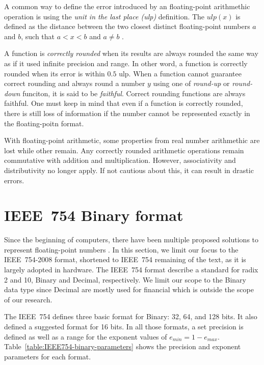 A common way to define the error introduced by an floating-point arithmethic
operation is using the \textit{unit in the last place (ulp)} definition.
The $ulp(x)$ is defined as the distance between the two closest distinct
floating-point numbers $a$ and $b$, such that $a < x < b$ and $a \neq b$ .

A function is \textit{correctly rounded} when its results are always rounded the 
same way as if it used infinite precision and range.
In other word, a function is correctly rounded when its error is within $0.5$ ulp.
When a function cannot guarantee correct rounding and always round a number $y$
using one of \textit{round-up} or \textit{round-down} funciton, it is said to be \textit{faithful}.
Correct rounding functions are always faithful.
One must keep in mind that even if a function is correctly rounded, there is
still loss of information if the number cannot be represented exactly in the
floating-poitn format.

With floating-point arithmetic, some properties from real number arithmethic are lost while other remain.
Any correctly rounded arithmetic operations remain commutative with addition and multiplication.
However, associativity and distributivity no longer apply.
If not cautious about this, it can result in drastic errors. 


\section{IEEE~754 Binary format}
Since the beginning of computers, there have been multiple proposed solutions to represent floating-point numbers .
In this section, we limit our focus to the IEEE~754-2008 format, shortened to IEEE~754 remaining of the text, as it is largely adopted in hardware.
The IEEE~754 format describe a standard for radix 2 and 10, Binary and Decimal, respectively.
We limit our scope to the Binary data type since Decimal are mostly used for financial which is outside the scope of our research.

The IEEE~754 defines three basic format for Binary: 32, 64, and 128 bits.
It also defined a suggested format for 16 bits.
In all those formats, a set precision is defined as well as a range for the exponent values of $e_{min} = 1 - e_{max}$.
Table~\ref{table:IEEE754-binary-parameters} shows the precision and exponent parameters for each format. 

